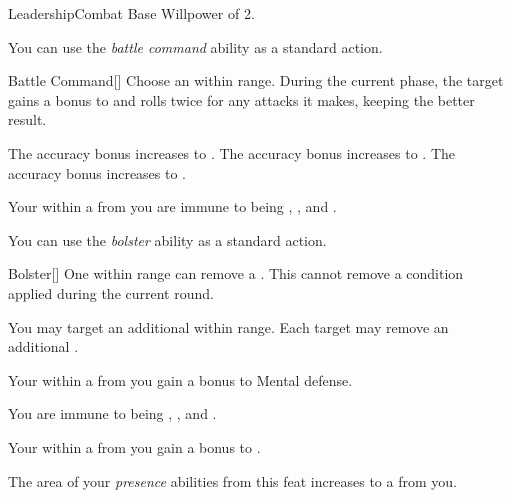     \begin{feat}{Leadership}{Combat}
        \featpre Base Willpower of 2.

         You can use the \textit{battle command} ability as a standard action.
        \begin{freeability}{Battle Command}[]
            Choose an  within \rngmed range.
            During the current phase, the target gains a  bonus to  and rolls twice for any attacks it makes, keeping the better result.

            \rankline
             The accuracy bonus increases to .
             The accuracy bonus increases to .
             The accuracy bonus increases to .
        \end{freeability}

         Your  within a \arealarge {} from you are immune to being , , and .

         You can use the \textit{bolster} ability as a standard action.
        \begin{freeability}{Bolster}[]
            One  within \rngmed range can remove a .
            This cannot remove a condition applied during the current round.

            \rankline
             You may target an additional  within range.
             Each target may remove an additional .
        \end{freeability}

         Your  within a \arealarge {} from you gain a  bonus to Mental defense.

         You are immune to being , , and .

         Your  within a \arealarge {} from you gain a  bonus to .

         The area of your \textit{presence} abilities from this feat increases to a \areahuge {} from you.
    \end{feat}

